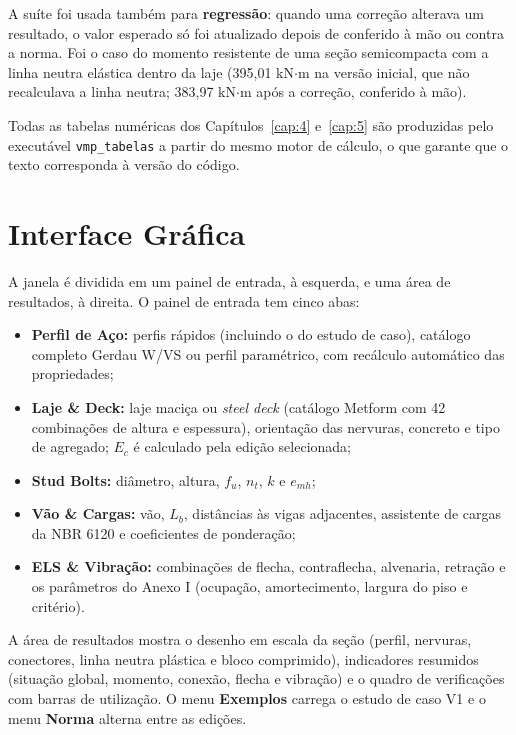 A suíte foi usada também para \textbf{regressão}: quando uma correção alterava um resultado, o valor esperado só foi atualizado depois de conferido à mão ou contra a norma. Foi o caso do momento resistente de uma seção semicompacta com a linha neutra elástica dentro da laje (395,01 kN\ensuremath{\cdot}m na versão inicial, que não recalculava a linha neutra; 383,97 kN\ensuremath{\cdot}m após a correção, conferido à mão).

Todas as tabelas numéricas dos Capítulos~\ref{cap:4} e~\ref{cap:5} são produzidas pelo executável \texttt{vmp\_tabelas} a partir do mesmo motor de cálculo, o que garante que o texto corresponda à versão do código.

\section{Interface Gráfica}\label{sec:3.5}
A janela é dividida em um painel de entrada, à esquerda, e uma área de resultados, à direita. O painel de entrada tem cinco abas:
\begin{itemize}
\item \textbf{Perfil de Aço:} perfis rápidos (incluindo o do estudo de caso), catálogo completo Gerdau W/VS ou perfil paramétrico, com recálculo automático das propriedades;
\item \textbf{Laje \& Deck:} laje maciça ou \emph{steel deck} (catálogo Metform com 42 combinações de altura e espessura), orientação das nervuras, concreto e tipo de agregado; $E_c$ é calculado pela edição selecionada;
\item \textbf{Stud Bolts:} diâmetro, altura, $f_u$, $n_t$, $k$ e $e_{mh}$;
\item \textbf{Vão \& Cargas:} vão, $L_b$, distâncias às vigas adjacentes, assistente de cargas da NBR 6120 e coeficientes de ponderação;
\item \textbf{ELS \& Vibração:} combinações de flecha, contraflecha, alvenaria, retração e os parâmetros do Anexo I (ocupação, amortecimento, largura do piso e critério).
\end{itemize}

A área de resultados mostra o desenho em escala da seção (perfil, nervuras, conectores, linha neutra plástica e bloco comprimido), indicadores resumidos (situação global, momento, conexão, flecha e vibração) e o quadro de verificações com barras de utilização. O menu \textbf{Exemplos} carrega o estudo de caso V1 e o menu \textbf{Norma} alterna entre as edições.
